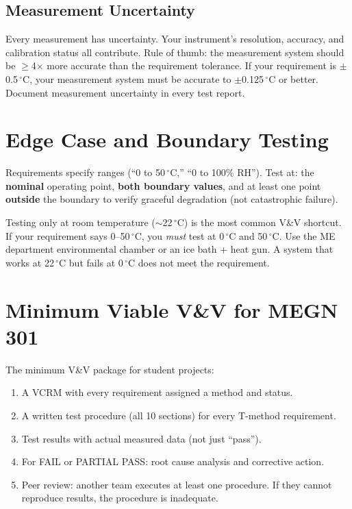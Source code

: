 \documentclass[11pt,letterpaper,twoside,openany]{book}
\newcommand{\degC}{\ensuremath{{}^{\circ}\text{C}}}
\begin{document}
\subsection{Measurement Uncertainty}
Every measurement has uncertainty. Your instrument's resolution, accuracy, and calibration status all contribute. Rule of thumb: the measurement system should be $\geq$4$\times$ more accurate than the requirement tolerance. If your requirement is $\pm$0.5\,\degC{}, your measurement system must be accurate to $\pm$0.125\,\degC{} or better. Document measurement uncertainty in every test report.

\section{Edge Case and Boundary Testing}
Requirements specify ranges (``0 to 50\,\degC{},'' ``0 to 100\% RH''). Test at: the \textbf{nominal} operating point, \textbf{both boundary values}, and at least one point \textbf{outside} the boundary to verify graceful degradation (not catastrophic failure).

\begin{tipbox}
Testing only at room temperature ($\sim$22\,\degC{}) is the most common V\&V shortcut. If your requirement says 0--50\,\degC{}, you \emph{must} test at 0\,\degC{} and 50\,\degC{}. Use the ME department environmental chamber or an ice bath + heat gun. A system that works at 22\,\degC{} but fails at 0\,\degC{} does not meet the requirement.
\end{tipbox}

\section{Minimum Viable V\&V for MEGN 301}
The minimum V\&V package for student projects:
\begin{enumerate}[nosep,leftmargin=1.5em]
\item A VCRM with every requirement assigned a method and status.
\item A written test procedure (all 10 sections) for every T-method requirement.
\item Test results with actual measured data (not just ``pass'').
\item For FAIL or PARTIAL PASS: root cause analysis and corrective action.
\item Peer review: another team executes at least one procedure. If they cannot reproduce results, the procedure is inadequate.
\end{enumerate}
\end{document}
